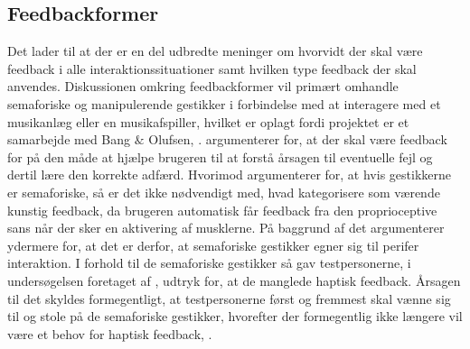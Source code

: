 \subsection{Feedbackformer}
\label{Feedbackformer}
%
Det lader til at der er en del udbredte meninger om hvorvidt der skal være feedback i alle interaktionssituationer samt hvilken type feedback der skal anvendes. Diskussionen omkring feedbackformer vil primært omhandle semaforiske og manipulerende gestikker i forbindelse med at interagere med et musikanlæg eller en musikafspiller, hvilket er oplagt fordi projektet er et samarbejde med Bang $\&$ Olufsen, . \blankline
%
\textcite[s. 10]{PDF:NaturalUserInterfaces} argumenterer for, at der skal være feedback for på den måde at hjælpe brugeren til at forstå årsagen til eventuelle fejl og dertil lære den korrekte adfærd. Hvorimod \textcite[s. 16]{PDF:PIEmbeddingHCIOnTheRelevance} argumenterer for, at hvis gestikkerne er semaforiske, så er det ikke nødvendigt med, hvad \textcite[s. 16]{PDF:PIEmbeddingHCIOnTheRelevance} kategorisere som værende kunstig feedback, da brugeren automatisk får feedback fra den proprioceptive sans når der sker en aktivering af musklerne. På baggrund af det argumenterer \textcite[s. 16]{PDF:PIEmbeddingHCIOnTheRelevance} ydermere for, at det er derfor, at semaforiske gestikker egner sig til perifer interaktion. I forhold til de semaforiske gestikker så gav testpersonerne, i undersøgelsen foretaget af \textcite[ss. 172-173]{PDF:ComparingInputModalities}, udtryk for, at de manglede haptisk feedback. Årsagen til det skyldes formegentligt, at testpersonerne først og fremmest skal vænne sig til og stole på de semaforiske gestikker, hvorefter der formegentlig ikke længere vil være et behov for haptisk feedback, \parencite[s. 174]{PDF:ComparingInputModalities}. 

